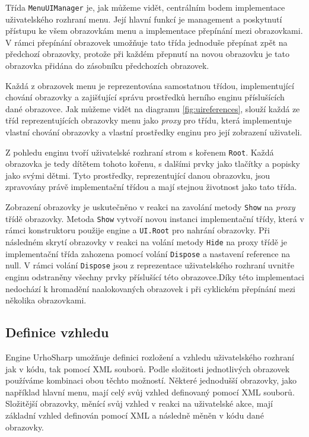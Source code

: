 Třída \texttt{MenuUIManager} je, jak můžeme vidět, centrálním bodem implementace uživatelského rozhraní menu. Její hlavní funkcí je management a poskytnutí přístupu ke všem obrazovkám menu a implementace přepínání mezi obrazovkami. V rámci přepínání obrazovek umožňuje tato třída jednoduše přepínat zpět na předchozí obrazovky, protože při každém přepnutí na novou obrazovku je tato obrazovka přidána do zásobníku předchozích obrazovek.

Každá z obrazovek menu je reprezentována samostatnou třídou, implementující chování obrazovky a zajišťující správu prostředků herního enginu příslušících dané obrazovce. Jak můžeme vidět na diagramu \ref{fig:uireferences}, slouží každá ze tříd reprezentujících obrazovky menu jako \textit{proxy} pro třídu, která implementuje vlastní chování obrazovky a vlastní prostředky enginu pro její zobrazení uživateli. 

Z pohledu enginu tvoří uživatelské rozhraní strom s kořenem \texttt{Root}. Každá obrazovka je tedy dítětem tohoto kořenu, s dalšími prvky jako tlačítky a popisky jako svými dětmi. Tyto prostředky, reprezentující danou obrazovku, jsou zpravovány právě implementační třídou a mají stejnou životnost jako tato třída.

Zobrazení obrazovky je uskutečněno v reakci na zavolání metody \texttt{Show} na \textit{proxy} třídě obrazovky. Metoda \texttt{Show} vytvoří novou instanci implementační třídy, která v rámci konstruktoru použije engine a \texttt{UI.Root} pro nahrání obrazovky. Při následném skrytí obrazovky v reakci na volání metody \texttt{Hide} na proxy třídě je implementační třída zahozena pomocí volání \texttt{Dispose} a nastavení reference na null. V rámci volání \texttt{Dispose} jsou z reprezentace uživatelského rozhraní uvnitře enginu odstraněny všechny prvky příslušící této obrazovce.Díky této implementaci nedochází k hromadění naalokovaných obrazovek i při cyklickém přepínání mezi několika obrazovkami.



\subsection{Definice vzhledu}
Engine UrhoSharp umožňuje definici rozložení a vzhledu uživatelského rozhraní jak v kódu, tak pomocí XML souborů. Podle složitosti jednotlivých obrazovek používáme kombinaci obou těchto možností. Některé jednodušší obrazovky, jako například hlavní menu, mají celý svůj vzhled definovaný pomocí XML souborů. Složitější obrazovky, měnící svůj vzhled v reakci na uživatelské akce, mají základní vzhled definován pomocí XML a následně měněn v kódu dané obrazovky. 

